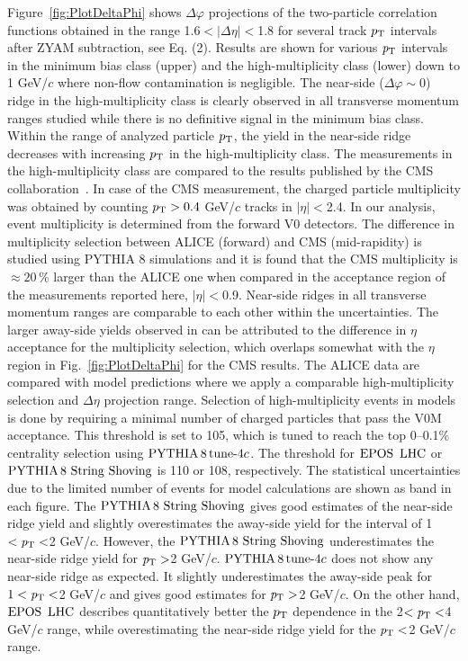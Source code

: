 Figure~\ref{fig:PlotDeltaPhi} shows $\Delta\varphi$ projections of the two-particle correlation functions obtained in the range 1.6$<|\Delta \eta |<$1.8 for several track $p_\mathrm{T}$ intervals after ZYAM subtraction, see Eq. (2). Results are shown for various $\it{p}_{\rm{T}}$ intervals in the minimum bias class (upper) and the high-multiplicity class (lower) down to 1 GeV/$c$ where non-flow contamination is negligible. The near-side ($\Delta\varphi\sim 0$) ridge in the high-multiplicity class is clearly observed in all transverse momentum ranges studied while there is no definitive signal in the minimum bias class. Within the range of analyzed particle $p_\mathrm{T}$, the yield in the near-side ridge decreases with increasing $p_\mathrm{T}$ in the high-multiplicity class. The measurements in the high-multiplicity class are compared to the results published by the CMS collaboration~\cite{Khachatryan:2015lva}. In case of the CMS measurement, the charged particle multiplicity was obtained by counting $p_\mathrm{T}>0.4$ GeV/$c$ tracks in $|\eta|<$2.4. In our analysis, event multiplicity is determined from the forward V0 detectors. The difference in multiplicity selection between ALICE (forward) and CMS (mid-rapidity) is studied using PYTHIA 8 simulations and it is found that the CMS multiplicity is ${\approx}20\,\%$ larger than the ALICE one when compared in the acceptance region of the measurements reported here, $|\eta|<$0.9. Near-side ridges in all transverse momentum ranges are comparable to each other within the uncertainties. The larger away-side yields observed in \cite{Khachatryan:2015lva} can be attributed to the difference in $\eta$ acceptance for the multiplicity selection, which overlaps somewhat with the $\eta$ region in Fig.~\ref{fig:PlotDeltaPhi} for the CMS results. The ALICE data are compared with model predictions where we apply a comparable high-multiplicity selection and $\Delta\eta$ projection range. Selection of high-multiplicity events in models is done by requiring a minimal number of charged particles that pass the V0M acceptance. This threshold is set to 105, which is tuned to reach the top 0--0.1\% centrality selection using $\mathrm{PYTHIA}\,8\,\mathrm{tune}{\text -}4c$. The threshold for ${\mathrm{EPOS}\,~\mathrm{LHC}}$ or ${\mathrm{PYTHIA}\,8~\mathrm{String}~}\mathrm{Shoving}$ is 110 or 108, respectively. The statistical uncertainties due to the limited number of events for model calculations are shown as band in each figure. The ${\mathrm{PYTHIA}\,8~\mathrm{String}~}\mathrm{Shoving}$ gives good estimates of the near-side ridge yield and slightly overestimates the away-side yield for the interval of 1$<\it{p}_{\rm{T}}<$2 GeV/$c$. However, the ${\mathrm{PYTHIA}\,8~\mathrm{String}~}\mathrm{Shoving}$ underestimates the near-side ridge yield for $\it{p}_{\rm{T}}>$2 GeV/$c$. $\mathrm{PYTHIA}\,8\,\mathrm{tune}{\text -}4c$ does not show any near-side ridge as expected. It slightly underestimates the away-side peak for $1<\it{p}_{\rm{T}}<$2 GeV/$c$ and gives good estimates for $\it{p}_{\rm{T}}>$2 GeV/$c$. On the other hand, ${\mathrm{EPOS}\,~\mathrm{LHC}}$ describes quantitatively better the $p_\mathrm{T}$ dependence in the 2$<\it{p}_{\rm{T}}<$4 GeV/$c$ range, while overestimating the near-side ridge yield for the $\it{p}_{\rm{T}}<$2 GeV/$c$ range. 


